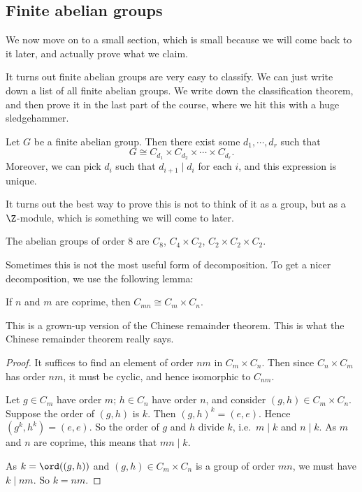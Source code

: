 \documentclass[a4paper]{article}
\begin{document}
\subsection{Finite abelian groups}
We now move on to a small section, which is small because we will come back to it later, and actually prove what we claim.

It turns out finite abelian groups are very easy to classify. We can just write down a list of all finite abelian groups. We write down the classification theorem, and then prove it in the last part of the course, where we hit this with a huge sledgehammer.

\begin{thm}
  Let $G$ be a finite abelian group. Then there exist some $d_1, \cdots, d_r$ such that
  \[
    G \cong C_{d_1} \times C_{d_2} \times \cdots \times C_{d_r}.
  \]
  Moreover, we can pick $d_i$ such that $d_{i + 1} \mid d_i$ for each $i$, and this expression is unique.
\end{thm}
It turns out the best way to prove this is not to think of it as a group, but as a $\Z$-module, which is something we will come to later.

\begin{eg}
  The abelian groups of order $8$ are $C_8$, $C_4 \times C_2$, $C_2 \times C_2 \times C_2$.
\end{eg}

Sometimes this is not the most useful form of decomposition. To get a nicer decomposition, we use the following lemma:
\begin{lemma}
  If $n$ and $m$ are coprime, then $C_{mn} \cong C_m \times C_n$.
\end{lemma}
This is a grown-up version of the Chinese remainder theorem. This is what the Chinese remainder theorem really says.

\begin{proof}
  It suffices to find an element of order $nm$ in $C_m \times C_n$. Then since $C_n \times C_m$ has order $nm$, it must be cyclic, and hence isomorphic to $C_{nm}$.

  Let $g \in C_m$ have order $m$; $h \in C_n$ have order $n$, and consider $(g, h) \in C_m \times C_n$. Suppose the order of $(g, h)$ is $k$. Then $(g, h)^k = (e, e)$. Hence $(g^k, h^k) = (e, e)$. So the order of $g$ and $h$ divide $k$, i.e.\ $m \mid k$ and $n \mid k$. As $m$ and $n$ are coprime, this means that $mn \mid k$.

  As $k = \ord((g, h))$ and $(g, h) \in C_m \times C_n$ is a group of order $mn$, we must have $k \mid nm$. So $k = nm$.
\end{proof}
\end{document}
